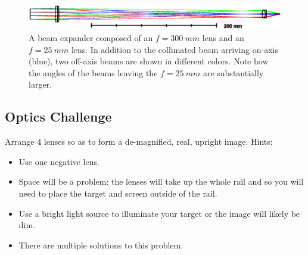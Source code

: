 \documentclass[a4paper]{report}
\begin{document}
\begin{figure}[h]
\center
\includegraphics[width=6in]{Telescope.eps}
\caption{A beam expander composed of an $f=300~mm$ lens and an $f=25~mm$ lens. 
In addition to the collimated beam arriving on-axis (blue), two off-axis beams are shown in different colors.
Note how the angles of the beams leaving the $f=25~mm$ are substantially larger.}
\label{fig:telescope}
\end{figure}

\clearpage


\subsection{Optics Challenge}
Arrange 4 lenses so as to form a de-magnified, real, upright image. Hints: 
\begin{itemize}
\item Use one negative lens.
\item Space will be a problem: the lenses will take up the whole rail and so you will need to place the target and screen outside of the rail.
\item Use a bright light source to illuminate your target or the image will likely be dim. 
\item There are multiple solutions to this problem.
\end{itemize}
\end{document}
